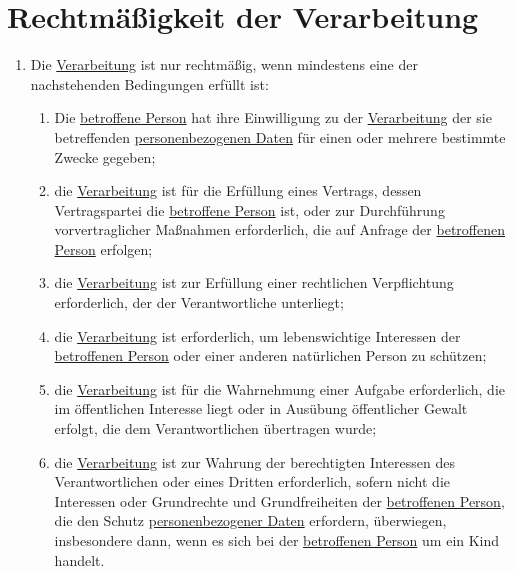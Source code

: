 \chapter{Rechtmäßigkeit der Verarbeitung}
\label{ch:6}


\begin{enumerate}

  \item Die \hyperref[itm:04-2]{Verarbeitung} ist nur rechtmäßig, wenn mindestens eine der nachstehenden Bedingungen erfüllt ist:
  \label{itm:06-1}

  \begin{enumerate}
  
    \item Die \hyperref[itm:04-1]{betroffene Person} hat ihre Einwilligung zu der \hyperref[itm:04-2]{Verarbeitung} der sie betreffenden \hyperref[itm:04-1]{personenbezogenen Daten}
     für einen oder mehrere bestimmte Zwecke gegeben;
    \label{itm:06-1a}

    \item die \hyperref[itm:04-2]{Verarbeitung} ist für die Erfüllung eines Vertrags, dessen Vertragspartei die \hyperref[itm:04-1]{betroffene Person} ist, oder
     zur Durchführung vorvertraglicher Maßnahmen erforderlich, die auf Anfrage der \hyperref[itm:04-1]{betroffenen Person} erfolgen;
    \label{itm:06-1b}

    \item die \hyperref[itm:04-2]{Verarbeitung} ist zur Erfüllung einer rechtlichen Verpflichtung erforderlich, der der Verantwortliche
     unterliegt;
    \label{itm:06-1c}

    \item die \hyperref[itm:04-2]{Verarbeitung} ist erforderlich, um lebenswichtige Interessen der \hyperref[itm:04-1]{betroffenen Person} oder einer anderen
     natürlichen Person zu schützen;
    \label{itm:06-1d}

    \item die \hyperref[itm:04-2]{Verarbeitung} ist für die Wahrnehmung einer Aufgabe erforderlich, die im öffentlichen Interesse liegt oder
     in Ausübung öffentlicher Gewalt erfolgt, die dem Verantwortlichen übertragen wurde;
    \label{itm:06-1e}

    \item die \hyperref[itm:04-2]{Verarbeitung} ist zur Wahrung der berechtigten Interessen des Verantwortlichen oder eines Dritten
     erforderlich, sofern nicht die Interessen oder Grundrechte und Grundfreiheiten der \hyperref[itm:04-1]{betroffenen Person}, die den
     Schutz \hyperref[itm:04-1]{personenbezogener Daten} erfordern, überwiegen, insbesondere dann, wenn es sich bei der \hyperref[itm:04-1]{betroffenen Person}
     um ein Kind handelt.
    \label{itm:06-1f}


\end{enumerate}
\end{enumerate}
